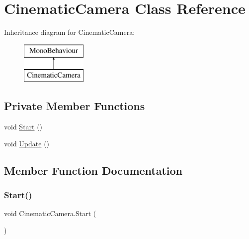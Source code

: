 \hypertarget{class_cinematic_camera}{}\section{Cinematic\+Camera Class Reference}
\label{class_cinematic_camera}
Inheritance diagram for Cinematic\+Camera\+:\begin{figure}[H]
\begin{center}
\leavevmode
\includegraphics[height=2.000000cm]{class_cinematic_camera}
\end{center}
\end{figure}
\subsection*{Private Member Functions}
\begin{DoxyCompactItemize}
\item 
void \hyperlink{class_cinematic_camera_a7725aed0091d59f81793a0d7625a3e74}{Start} ()
\item 
void \hyperlink{class_cinematic_camera_a5716ab0ee2ce8829223cce6670cf5f2f}{Update} ()
\end{DoxyCompactItemize}


\subsection{Member Function Documentation}
\mbox{\label{class_cinematic_camera_a7725aed0091d59f81793a0d7625a3e74}} 
\subsubsection{\texorpdfstring{Start()}{Start()}}
{\footnotesize\ttfamily void Cinematic\+Camera.\+Start (\begin{DoxyParamCaption}{ }\end{DoxyParamCaption})\hspace{0.3cm}{\ttfamily [private]}}

\mbox{\label{class_cinematic_camera_a5716ab0ee2ce8829223cce6670cf5f2f}} 
